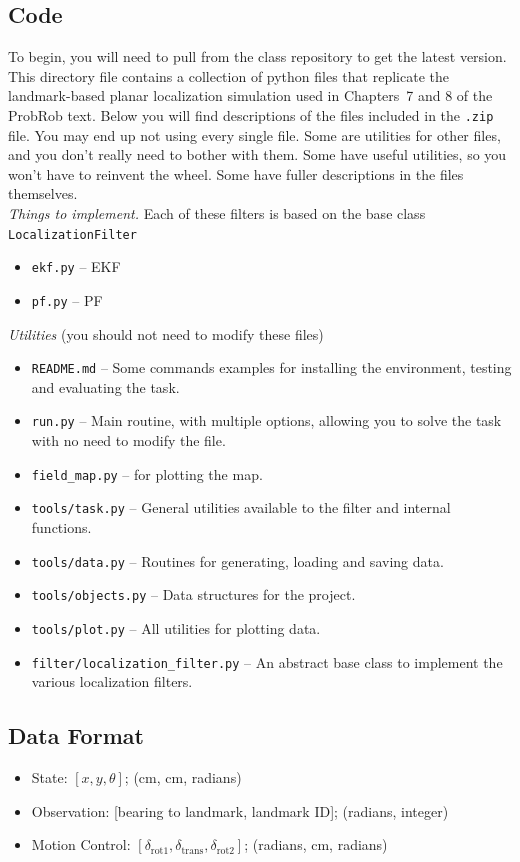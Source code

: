 \documentclass[11pt, oneside, letterpaper]{article}
\begin{document}
\subsection*{Code}
To begin, you will need to pull from the class repository to get the latest version.  This directory file contains a collection of python files that replicate the landmark-based planar localization simulation used in Chapters~7 and 8 of the ProbRob text.  Below you will find descriptions of the files included in the \texttt{.zip} file. You may end up not using every single file. Some are utilities for other files, and you don't really need to bother with them. Some have useful utilities, so you won't have to reinvent the wheel. Some have fuller descriptions in the files themselves.\\
\emph{Things to implement.} Each of these filters is based on the base class \texttt{LocalizationFilter} 
\begin{itemize}
\item \texttt{ekf.py} -- EKF
\item \texttt{pf.py} -- PF
\end{itemize}
\emph{Utilities} (you should not need to modify these files)
\begin{itemize}
\item \texttt{README.md} -- Some commands examples for installing the environment, testing and evaluating the task.
\item \texttt{run.py} -- Main routine, with multiple options, allowing you to solve the task with no need to modify the file.
\item \texttt{field\_map.py} -- for plotting the map.
\item \texttt{tools/task.py} -- General utilities available to the filter and internal functions.
\item \texttt{tools/data.py} -- Routines for generating, loading and saving data.
\item \texttt{tools/objects.py} -- Data structures for the project.
\item \texttt{tools/plot.py} -- All utilities for plotting data.
\item \texttt{filter/localization\_filter.py} -- An abstract base class to implement the various localization filters.
\end{itemize}


\subsection*{Data Format}
\begin{itemize}
\item State: $[x,y, \theta]$; (cm, cm, radians)
\item Observation: [bearing to landmark, landmark ID]; (radians, integer)
\item Motion Control: $[\delta_{\text{rot1}},\delta_{\text{trans}},\delta_{\text{rot2}}]$; (radians, cm, radians)
\end{itemize}
\end{document}
